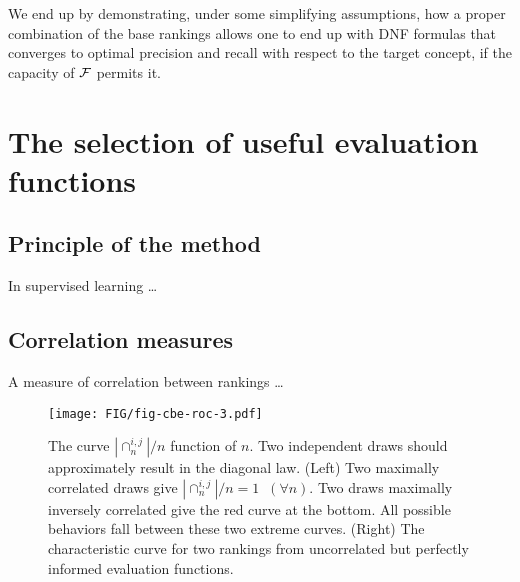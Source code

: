 \documentclass[twocolumn,english]{article}
\begin{document}
We end up by demonstrating, under some simplifying assumptions, how a proper combination of the base rankings allows one to end up with DNF formulas that converges to optimal precision and recall with respect to the target concept, if the capacity of ${\cal F}$ permits it. 



\section{The selection of useful evaluation functions}

\subsection{Principle of the method}

In supervised learning \ldots


\subsection{Correlation measures}

A measure of correlation between rankings \ldots

\begin{figure*}[t]
\centering
\texttt{[image: FIG/fig-cbe-roc-3.pdf]}
\caption{The curve $|\cap_n^{i,j}|/n$ function of $n$. Two independent draws should approximately result in the diagonal law. (Left) Two maximally correlated draws give $|\cap_n^{i,j}|/n=1 \;\; (\forall n)$. Two draws maximally inversely correlated give the red curve at the bottom. All possible behaviors fall between these two extreme curves. (Right) The characteristic curve for two rankings from uncorrelated but perfectly informed evaluation functions.}
\label{fig-correlation-curves}
\end{figure*}
\end{document}
